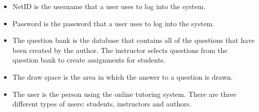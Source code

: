 \begin{itemize}
\item NetID is the username that a user uses to log into the system.
\item Password is the password that a user uses to log into the system.
\item The question bank is the database that contains all of the questions that have been created by the author. The instructor selects questions from the question bank to create assignments for students.
\item The draw space is the area in which the answer to a question is drawn.
\item The user is the person using the online tutoring system. There are three different types of users: students, instructors and authors.
\end{itemize}